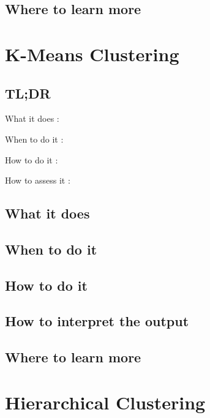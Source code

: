 \documentclass[
]{book}
\begin{document}
\hypertarget{where-to-learn-more-21}{%
\section{Where to learn more}\label{where-to-learn-more-21}}

\hypertarget{k-means-clustering}{%
\chapter{K-Means Clustering}\label{k-means-clustering}}

\hypertarget{tldr-22}{%
\section{TL;DR}\label{tldr-22}}

What it does
:

When to do it
:

How to do it
:

How to assess it
:

\hypertarget{what-it-does-22}{%
\section{What it does}\label{what-it-does-22}}

\hypertarget{when-to-do-it-22}{%
\section{When to do it}\label{when-to-do-it-22}}

\hypertarget{how-to-do-it-22}{%
\section{How to do it}\label{how-to-do-it-22}}

\hypertarget{how-to-interpret-the-output-22}{%
\section{How to interpret the output}\label{how-to-interpret-the-output-22}}

\hypertarget{where-to-learn-more-22}{%
\section{Where to learn more}\label{where-to-learn-more-22}}

\hypertarget{hierarchical-clustering}{%
\chapter{Hierarchical Clustering}\label{hierarchical-clustering}}
\end{document}
